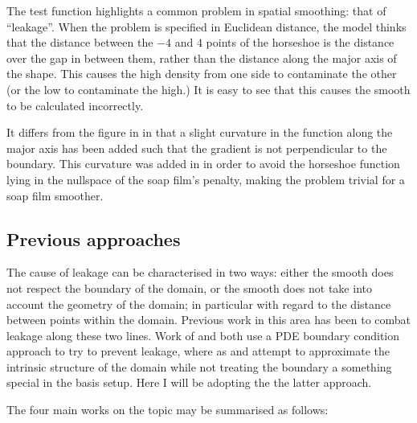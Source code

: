 The test function highlights a common problem in spatial smoothing: that of ``leakage''. When the problem is specified in Euclidean distance, the model thinks that the distance between the $-4$ and $4$ points of the horseshoe is the distance over the gap in between them, rather than the distance along the major axis of the shape. This causes the high density from one side to contaminate the other (or the low to contaminate the high.) It is easy to see that this causes the smooth to be calculated incorrectly.

It differs from the figure in \cite{ramsay} in that a slight curvature in the function along the major axis has been added such that the gradient is not perpendicular to the boundary. This curvature was added in \cite{soap}  in order to avoid the horseshoe function lying in the nullspace of the soap film's penalty, making the problem trivial for a soap film smoother.
		
\subsection{Previous approaches}

The cause of leakage can be characterised in two ways: either the smooth does not respect the boundary of the domain, or the smooth does not take into account the geometry of the domain; in particular with regard to the distance between points within the domain. Previous work in this area has been to combat leakage along these two lines. Work of \cite{ramsay} and \cite{soap} both use a PDE boundary condition approach to try to prevent leakage, where as \cite{wangranalli} and \cite{eilerstalk}  attempt to approximate the intrinsic structure of the domain while not treating the boundary a something special in the basis setup. Here I will be adopting the the latter approach.

The four main works on the topic may be summarised as follows:

